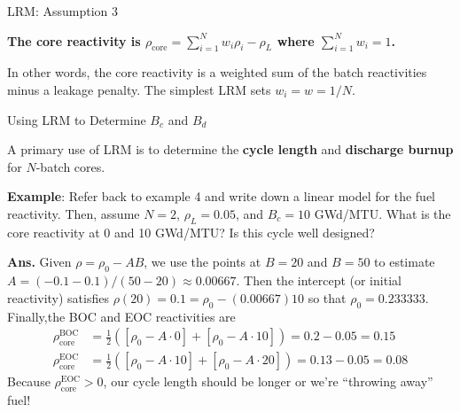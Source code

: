 \documentclass[aspectratio=1610]{beamer}
\begin{document}
\begin{frame}[fragile]{LRM: Assumption 3}

\begin{center}
{\bf {\large \textcolor{wcprimary}{
The core reactivity is  
 $\boxed{\rho_{\text{core}} = \sum^N_{i=1} w_i \rho_i - \rho_{L}}$ where $\boxed{\sum_{i=1}^N w_i = 1}$.
}}}
\end{center} 

\vfill 

In other words, the core reactivity is a weighted sum of the batch reactivities minus a leakage penalty.  The simplest LRM sets $\boxed{w_i = w = 1/N}$.

\end{frame}

\begin{frame}[fragile]{Using LRM to Determine $B_c$ and $B_d$}
 
A primary use of LRM is to determine the {\bf cycle length} and {\bf discharge burnup} for $N$-batch cores.

\vspace{0.25cm}

{\bf Example}: Refer back to example 4 and write down a linear model for the fuel reactivity.  Then, assume $N=2$, $\rho_L=0.05$, and $B_c = 10$ GWd/MTU.  What is the core reactivity at 0 and 10 GWd/MTU? Is this cycle well designed?

\vfill 

\pause 

\textcolor{wcprimary}{{\small {\bf Ans.} Given $\rho = \rho_0 - A  B$, we use the points at $B=20$ and $B=50$ to estimate $A = (-0.1 - 0.1)/(50-20) \approx 0.00667$.  Then the intercept (or initial reactivity) satisfies $\rho(20) = 0.1 = \rho_0 - (0.00667)10$ so that $\rho_0 = 0.233333$.  Finally,the BOC and EOC reactivities are
\begin{align*}
 \rho_{\text{core}}^{\text{BOC}} &= \frac{1}{2} ( [\rho_0 - A\cdot 0] + [\rho_0 - A\cdot 10]) = 0.2 - 0.05 = 0.15 \\
 \rho_{\text{core}}^{\text{EOC}} &= \frac{1}{2} ( [\rho_0 - A\cdot 10] + [\rho_0 - A\cdot 20]) = 0.13 - 0.05 = 0.08
\end{align*}
Because $\rho_{\text{core}}^{\text{EOC}} > 0$, our cycle length should be longer or we're ``throwing away'' fuel!}}

\end{frame}
\end{document}
